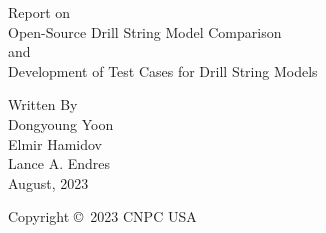 \hypersetup{pageanchor=false}

\begin{titlepage}
\thispagestyle{ledateinfooter}
\bfseries

\begin{center}

\Large Report on\\
\LARGE Open-Source Drill String Model Comparison\\
\Large and\\
\LARGE Development of Test Cases for Drill String Models


\vfill

\large Written By\\
\Large Dongyoung Yoon\\
\Large Elmir Hamidov\\
\Large Lance A. Endres\\
\vspace*{2pt}
\large August, 2023

\vfill

\normalsize Copyright \copyright\ 2023 CNPC USA
\end{center}

\normalsize
\end{titlepage}

\hypersetup{pageanchor=true} 